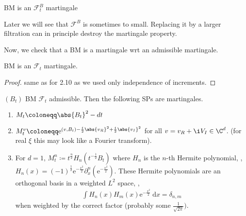 \begin{prop}[2.10]
BM is an $\mathcal{F}_t^B$ martingale
\end{prop}

Later we will see that $\mathcal{F}^B$ is sometimes to small.
Replacing it by a larger filtration can in principle destroy the martingale property.

\begin{defi}

\end{defi}

Now, we check that a BM is a martingale wrt an admissible martingale.
\begin{prop}
BM is an $\mathcal{F}_t$ martingale.
\end{prop}
\begin{proof}
same as for 2.10 as we used only independence of increments.
\end{proof}

\begin{prop}
$(B_t)$ BM $\mathcal{F}_t$ admissible.
Then the following SPs are martingales.
\begin{enumerate}[label=\roman*)]
\item $M_t\coloneqq \abs{B_t}^2-dt$
\item $M_t^v \coloneqq \mathrm{e}^{(v,B_t)-\frac{t}{2}\abs{v_R}^2+\frac{t}{2}\abs{v_I}^2}$ for all $v=v_R+\i V_I \in \C^d$. (for real $\xi$ this may look like a Fourier transform).
\item For $d=1$, $M_t^n \coloneqq t^{\frac{n}{2}} H_n(t^{-\frac{1}{2}}B_t)$ where $H_n$ is the $n$-th Hermite polynomial, \ie ,
$H_n(x)=(-1)^{\frac{1}{2}} \mathrm{e}^{-\frac{x^2}{2}} \partial_x^n(\mathrm{e}^{-\frac{x^2}{2}})$.
These Hermite polynomials are an orthogonal basis in a weighted $\mathit{L}^2$ space, \ie ,
\begin{align*}
\int H_n(x)H_m(x) \mathrm{e}^{-\frac{x^2}{2}}~\mathrm{d}x=\delta_{n,m}
\end{align*}
when weighted by the correct factor (probably some $\frac{1}{\sqrt{2\pi}})$.
\end{enumerate}
\end{prop}

